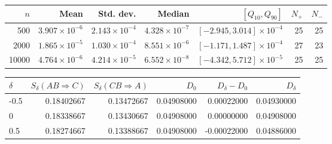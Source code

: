 \begin{table}
\label{tab:exchangeable-fixed}
\begin{tabular}{rrrrrrr}
\toprule
$n$ & Mean & Std. dev. & Median & $[Q_{10},Q_{90}]$ & $N_+$ & $N_-$ \\
\midrule
500 & $3.907\times10^{-6}$ & $2.143\times10^{-4}$ & $4.328\times10^{-7}$ & $[-2.945,3.014]\times10^{-4}$ & 25 & 25 \\
2000 & $1.865\times10^{-5}$ & $1.030\times10^{-4}$ & $8.551\times10^{-6}$ & $[-1.171,1.487]\times10^{-4}$ & 27 & 23 \\
10000 & $4.764\times10^{-6}$ & $4.214\times10^{-5}$ & $6.552\times10^{-8}$ & $[-4.342,5.712]\times10^{-5}$ & 25 & 25 \\
\bottomrule
\end{tabular}
\end{table}

\begin{table}
\label{tab:multiitem-worked}
\begin{tabular}{lrrrrr}
\toprule
$\delta$ & $S_\delta(AB\Rightarrow C)$ & $S_\delta(CB\Rightarrow A)$ & $D_0$ & $D_\delta-D_0$ & $D_\delta$ \\
\midrule
-0.5 & 0.18402667 & 0.13472667 & 0.04908000 & 0.00022000 & 0.04930000 \\
0 & 0.18338667 & 0.13430667 & 0.04908000 & 0.00000000 & 0.04908000 \\
0.5 & 0.18274667 & 0.13388667 & 0.04908000 & -0.00022000 & 0.04886000 \\
\bottomrule
\end{tabular}
\end{table}

